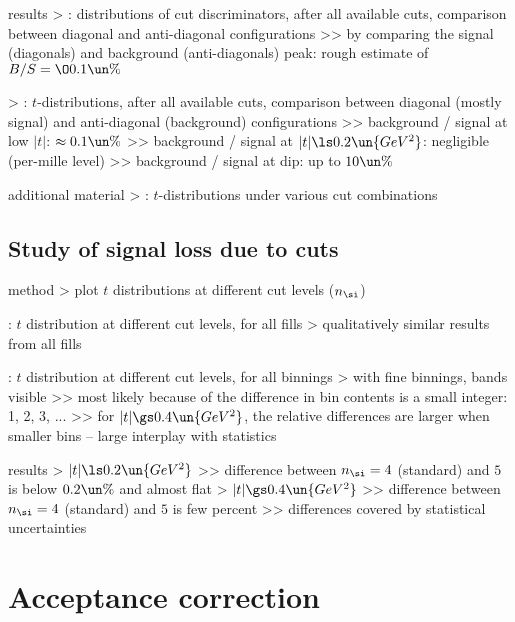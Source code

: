 \> results
\>> : distributions of cut discriminators, after all available cuts, comparison between diagonal and anti-diagonal configurations
\>>> by comparing the signal (diagonals) and background (anti-diagonals) peak: rough estimate of $B/S = \O{0.1\un{\%}}$

\>> : $t$-distributions, after all available cuts, comparison between diagonal (mostly signal) and anti-diagonal (background) configurations
\>>> background / signal at low $|t|$: $\approx 0.1\un{\%}$
\>>> background / signal at $|t| \ls 0.2\un{GeV^2}$: negligible (per-mille level)
\>>> background / signal at dip: up to $10\un{\%}$


\> additional material
\>> : $t$-distributions under various cut combinations

\section{Study of signal loss due to cuts}

\> method
\>> plot $t$ distributions at different cut levels ($n_\si$)

\> : $t$ distribution at different cut levels, for all fills
\>> qualitatively similar results from all fills

\> : $t$ distribution at different cut levels, for all binnings
\>> with fine binnings, bands visible
\>>> most likely because of the difference in bin contents is a small integer: 1, 2, 3, ...
\>>> for $|t| \gs 0.4\un{GeV^2}$, the relative differences are larger when smaller bins -- large interplay with statistics

\> results
\>> $|t| \ls 0.2\un{GeV^2}$
\>>> difference between $n_\si = 4$ (standard) and $5$ is below $0.2\un{\%}$ and almost flat
\>> $|t| \gs 0.4\un{GeV^2}$
\>>> difference between $n_\si = 4$ (standard) and $5$ is few percent
\>>> differences covered by statistical uncertainties



\chapter{Acceptance correction}

